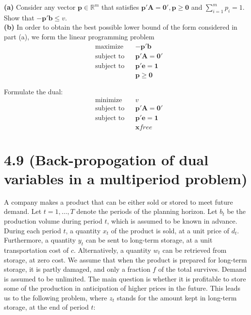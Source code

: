 \documentclass{article}
\begin{document}
\noindent
\textbf{(a)} Consider any vector $\mathbf{p} \in \mathbb{R}^m$ that satisfies $\mathbf{p'A = 0', p \geq 0}$ and $\sum_{i=1}^m p_i = 1$.  Show that $\mathbf{-p'b} \leq v$. \\


\noindent
\textbf{(b)}  In order to obtain the best possible lower bound of the form considered in part (a), we form the linear programming problem
\begin{equation*}
\begin{aligned}
& \text{maximize} && \mathbf{-p'b} \\
& \text{subject to} &&  \mathbf{p'A = 0'} \\
& \text{subject to} &&  \mathbf{p'e = 1} \\
& & &\mathbf{p \geq 0}
\end{aligned}
\end{equation*}

\noindent
Formulate the dual:
\begin{equation*}
\begin{aligned}
& \text{minimize} && v \\
& \text{subject to} &&  \mathbf{p'A = 0'} \\
& \text{subject to} &&  \mathbf{p'e = 1} \\
& & &\mathbf{x} free
\end{aligned}
\end{equation*}


\section*{4.9 (Back-propogation of dual variables in a multiperiod problem)}
A company makes a product that can be either sold or stored to meet future demand.  Let $t = 1, \ldots, T$ denote the periods of the planning horizon.  Let $b_t$ be the production volume during period $t$, which is assumed to be known in advance.  During each period $t$, a quantity $x_t$ of the product is sold, at a unit price of $d_t$.  Furthermore, a quantity $y_t$ can be sent to long-term storage, at a unit transportation cost of $c.$  Alternatively, a quantity $w_t$ can be retrieved from storage, at zero cost.  We assume that when the product is prepared for long-term storage, it is partly damaged, and only a fraction $f$ of the total survives.  Demand is assumed to be unlimited.  The main question is whether it is profitable to store some of the production in anticipation of higher prices in the future.  This leads us to the following problem, where $z_t$ stands for the amount kept in long-term storage, at the end of period $t$: \\
\end{document}
